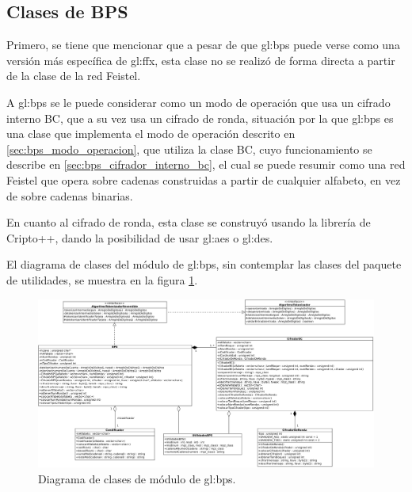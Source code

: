 %
%
%

\subsection{Clases de BPS}

Primero, se tiene que mencionar que a pesar de que \gls{gl:bps} puede verse como
una versión más específica de \gls{gl:ffx}, esta clase no se realizó de forma
directa a partir de la clase de la red Feistel.

A \gls{gl:bps} se le puede considerar como un modo de operación que usa un
cifrado interno BC, que a su vez usa un cifrado de ronda, situación por la que
\gls{gl:bps} es una clase que implementa el modo de operación descrito en
\ref{sec:bps_modo_operacion}, que utiliza la clase BC, cuyo funcionamiento se
describe en \ref{sec:bps_cifrador_interno_bc}, el cual se puede resumir como
una red Feistel que opera sobre cadenas construidas a partir de cualquier
alfabeto, en vez de sobre cadenas binarias.

En cuanto al cifrado de ronda, esta clase se construyó usando la librería de
Cripto++, dando la posibilidad de usar \gls{gl:aes} o \gls{gl:des}.


El diagrama de clases del módulo de \gls{gl:bps}, sin contemplar las clases del
paquete de utilidades, se muestra en la figura \ref{diagrama_clases_bps}.

\begin{figure}
  \begin{center}
    \includegraphics[width=1.0\linewidth]{diagramas/bps.png}
    \caption{Diagrama de clases de módulo de \gls{gl:bps}.}
    \label{diagrama_clases_bps}
  \end{center}
\end{figure}
